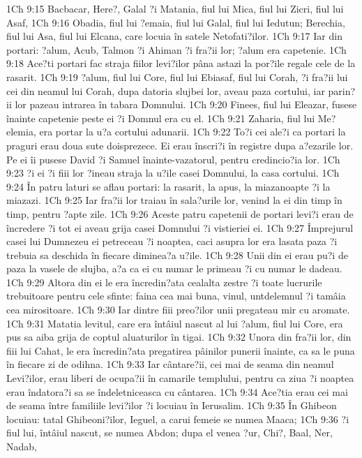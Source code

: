1Ch 9:15  Bacbacar, Here?, Galal ?i Matania, fiul lui Mica, fiul lui Zicri, fiul lui Asaf,
1Ch 9:16  Obadia, fiul lui ?emaia, fiul lui Galal, fiul lui Iedutun; Berechia, fiul lui Asa, fiul lui Elcana, care locuia în satele Netofati?ilor.
1Ch 9:17  Iar din portari: ?alum, Acub, Talmon ?i Ahiman ?i fra?ii lor; ?alum era capetenie.
1Ch 9:18  Ace?ti portari fac straja fiilor levi?ilor pâna astazi la por?ile regale cele de la rasarit.
1Ch 9:19  ?alum, fiul lui Core, fiul lui Ebiasaf, fiul lui Corah, ?i fra?ii lui cei din neamul lui Corah, dupa datoria slujbei lor, aveau paza cortului, iar parin?ii lor pazeau intrarea în tabara Domnului.
1Ch 9:20  Finees, fiul lui Eleazar, fusese înainte capetenie peste ei ?i Domnul era cu el.
1Ch 9:21  Zaharia, fiul lui Me?elemia, era portar la u?a cortului adunarii.
1Ch 9:22  To?i cei ale?i ca portari la praguri erau doua sute doisprezece. Ei erau înscri?i în registre dupa a?ezarile lor. Pe ei îi pusese David ?i Samuel înainte-vazatorul, pentru credincio?ia lor.
1Ch 9:23  ?i ei ?i fiii lor ?ineau straja la u?ile casei Domnului, la casa cortului.
1Ch 9:24  În patru laturi se aflau portari: la rasarit, la apus, la miazanoapte ?i la miazazi.
1Ch 9:25  Iar fra?ii lor traiau în sala?urile lor, venind la ei din timp în timp, pentru ?apte zile.
1Ch 9:26  Aceste patru capetenii de portari levi?i erau de încredere ?i tot ei aveau grija casei Domnului ?i vistieriei ei.
1Ch 9:27  Împrejurul casei lui Dumnezeu ei petreceau ?i noaptea, caci asupra lor era lasata paza ?i trebuia sa deschida în fiecare diminea?a u?ile.
1Ch 9:28  Unii din ei erau pu?i de paza la vasele de slujba, a?a ca ei cu numar le primeau ?i cu numar le dadeau.
1Ch 9:29  Altora din ei le era încredin?ata cealalta zestre ?i toate lucrurile trebuitoare pentru cele sfinte: faina cea mai buna, vinul, untdelemnul ?i tamâia cea mirositoare.
1Ch 9:30  Iar dintre fiii preo?ilor unii pregateau mir cu aromate.
1Ch 9:31  Matatia levitul, care era întâiul nascut al lui ?alum, fiul lui Core, era pus sa aiba grija de coptul aluaturilor în tigai.
1Ch 9:32  Unora din fra?ii lor, din fiii lui Cahat, le era încredin?ata pregatirea pâinilor punerii înainte, ca sa le puna în fiecare zi de odihna.
1Ch 9:33  Iar cântare?ii, cei mai de seama din neamul Levi?ilor, erau liberi de ocupa?ii în camarile templului, pentru ca ziua ?i noaptea erau îndatora?i sa se îndeletniceasca cu cântarea.
1Ch 9:34  Ace?tia erau cei mai de seama între familiile levi?ilor ?i locuiau în Ierusalim.
1Ch 9:35  În Ghibeon locuiau: tatal Ghibeoni?ilor, Ieguel, a carui femeie se numea Maaca;
1Ch 9:36  ?i fiul lui, întâiul nascut, se numea Abdon; dupa el venea ?ur, Chi?, Baal, Ner, Nadab,
